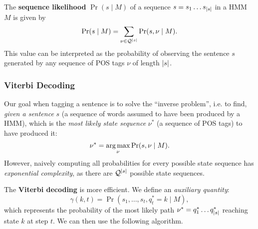 \begin{mydef}
	The \textbf{sequence likelihood} \(\Pr(s \mid M)\) of a sequence \(s = s_1\dots s_{{\left\lvert s\right\lvert}}\) in a HMM \(M\) is given by
	\[
	\Pr(s \mid M) = \sum_{\nu \in \mathcal{Q}^{{\left\lvert s\right\lvert}}} \Pr(s, \nu \mid M).
	\]
	This value can be interpreted as the probability of observing the sentence \(s\) generated by any sequence of POS tags \(\nu\) of length \({\left\lvert s\right\lvert}\).
\end{mydef}

\subsubsection{Viterbi Decoding}
Our goal when tagging a sentence is to solve the ``inverse problem'', i.e. to find, \emph{given a sentence} \(s\) (a sequence of words assumed to have been produced by a HMM), which is the \emph{most likely state sequence} \(\nu^*\) (a sequence of POS tags) to have produced it:
\[
\nu^* = \operatorname*{arg\,max}_{\nu} \Pr(s, \nu \mid M).
\]
However, naively computing all probabilities for every possible state sequence has \emph{exponential complexity}, as there are \(\mathcal{Q}^{{\left\lvert s\right\lvert}}\) possible state sequences.

The \textbf{Viterbi decoding} is more efficient.
We define an \emph{auxiliary quantity}:
\[
\gamma(k, t) = \Pr(s_1, \dots, s_t, q_t^* = k \mid M),
\]
which represents the probability of the most likely path \(\nu^* = q_1^* \dots q_{{\left\lvert s\right\lvert}}^*\) reaching state \(k\) at step \(t\).
We can then use the following algorithm.

